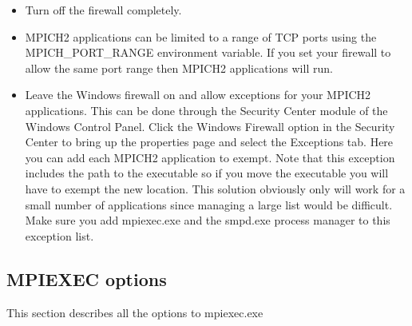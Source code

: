 \documentclass[dvipdfm,11pt]{article}
\begin{document}
\begin{itemize}
\item Turn off the firewall completely.
\item  MPICH2 applications can be limited to a range of TCP ports using the 
MPICH\_PORT\_RANGE environment variable.  If you set your firewall to allow the
same port range then MPICH2 applications will run.
\item Leave the Windows firewall on and allow exceptions for your MPICH2 applications.
This can be done through the Security Center module of the Windows Control 
Panel.  Click the Windows Firewall option in the Security Center to bring up
the properties page and select the Exceptions tab.  Here you can add each 
MPICH2 application to exempt.  Note that this exception includes the path to
the executable so if you move the executable you will have to exempt the new
location.  This solution obviously only will work for a small number of 
applications since managing a large list would be difficult.  Make sure you add
mpiexec.exe and the smpd.exe process manager to this exception list.
\end{itemize}

\subsection{MPIEXEC options}
This section describes all the options to mpiexec.exe
\end{document}
